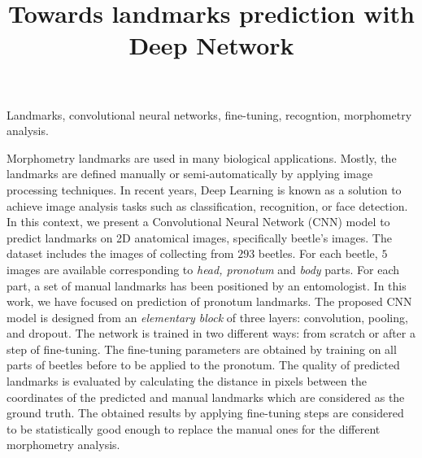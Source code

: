 \documentclass[10pt]{article}
\begin{document}
\noindent



\title{Towards landmarks prediction with Deep Network}




\maketitle

\keywords
Landmarks, convolutional neural networks, fine-tuning, recogntion, morphometry analysis.

\abstract
Morphometry landmarks are used in many biological
applications. Mostly, the landmarks are defined manually or
semi-automatically by applying image processing techniques. In recent
years, Deep Learning is known as a solution to achieve image analysis tasks such as
classification, recognition, or face detection. In this context, we
present a Convolutional Neural Network (CNN) model to predict landmarks on 2D
anatomical images, specifically beetle's images. The dataset includes the images of 
collecting from $293$ beetles. For each beetle, $5$ images are available corresponding to \textit{head, pronotum} and \textit{body} parts. For each part, a set of manual landmarks has been positioned by an entomologist. In this work, we have focused on prediction of pronotum landmarks. The proposed CNN model is designed from an \textit{elementary block} of three layers: convolution, pooling, and dropout. The network is trained in two different ways: from scratch or after a step of fine-tuning. The fine-tuning parameters are obtained by training on all parts of beetles before to be applied to the pronotum. The quality of predicted landmarks is evaluated by calculating the distance in pixels between the
coordinates of the predicted and manual landmarks which are considered as the ground truth. The obtained results by applying fine-tuning steps are considered to be statistically good enough to replace the manual ones for the different morphometry analysis.
\end{document}
